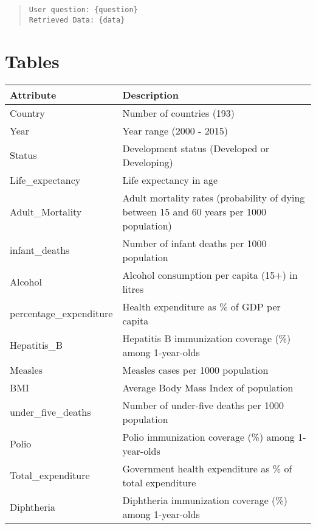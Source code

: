\documentclass[11pt]{article}
\begin{document}
\section{}
\begin{quote}
\texttt{User question: \{question\} }\\
\texttt{Retrieved Data: \{data\}}
\label{append:9}
\end{quote}



\section{Tables}

\begin{table*}[t]
\centering
\begin{tabular}{|p{}|p{}|}
\hline
\textbf{Attribute} & \textbf{Description} \\ \hline
Country & Number of countries (193) \\ \hline
Year & Year range (2000 - 2015) \\ \hline
Status & Development status (Developed or Developing) \\ \hline
Life\_expectancy & Life expectancy in age \\ \hline
Adult\_Mortality & Adult mortality rates (probability of dying between 15 and 60 years per 1000 population) \\ \hline
infant\_deaths & Number of infant deaths per 1000 population \\ \hline
Alcohol & Alcohol consumption per capita (15+) in litres \\ \hline
percentage\_expenditure & Health expenditure as \% of GDP per capita \\ \hline
Hepatitis\_B & Hepatitis B immunization coverage (\%) among 1-year-olds \\ \hline
Measles & Measles cases per 1000 population \\ \hline
BMI & Average Body Mass Index of population \\ \hline
under\_five\_deaths & Number of under-five deaths per 1000 population \\ \hline
Polio & Polio immunization coverage (\%) among 1-year-olds \\ \hline
Total\_expenditure & Government health expenditure as \% of total expenditure \\ \hline
Diphtheria & Diphtheria immunization coverage (\%) among 1-year-olds \\ \hline

\end{tabular}
\end{table*}
\end{document}
